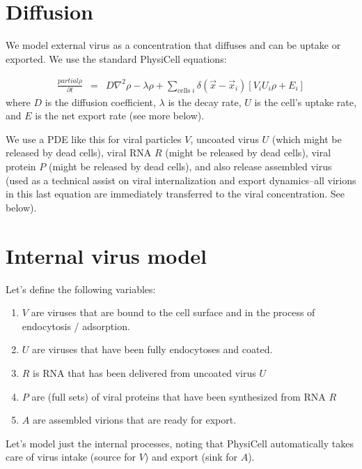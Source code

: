 \documentclass[12point]{article}
\begin{document}
\section{Diffusion}
We model external virus as a concentration that diffuses and can be uptake or exported. We use the standard PhysiCell equations: 

\begin{eqnarray}
\frac{partial \rho }{\partial t} & = & 
D \nabla^2 \rho - \lambda \rho + 
\sum_{\textrm{cells }i} 
\delta( \vec{x} - \vec{x}_i ) \left[ 
V_i U_i \rho + E_i 
\right]
\end{eqnarray}
where $D$ is the diffusion coefficient, $\lambda$ is the decay rate, $U$ is the cell's uptake rate, and $E$ is the net export rate (see more below). 

We use a PDE like this for viral particles $V$, uncoated virus $U$ (which might be released by dead cells), viral RNA $R$ (might be released by dead cells), viral protein $P$ (might be released by dead cells), and also 
release assembled virus (used as a technical assist on viral internalization and export dynamics--all virions in this last equation are immediately transferred to the viral concentration. See below). 

\section{Internal virus model}
Let's define the following variables: 
\begin{enumerate}
\item 
$V$ are viruses that are bound to the cell surface and in the process of endocytosis / adsorption. 

\item 
$U$ are viruses that have been fully endocytoses and coated. 

\item 
$R$ is RNA that has been delivered from uncoated virus $U$

\item 
$P$ are (full sets) of viral proteins that have been synthesized from RNA $R$

\item 
$A$ are assembled virions that are ready for export. 

\end{enumerate}
Let's model just the internal processes, noting that PhysiCell automatically takes care of virus intake (source for $V$) and export (sink for $A$). 
\end{document}

